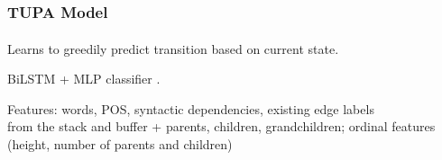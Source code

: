 \documentclass[t,xcolor={svgnames}]{beamer}
\newcommand{\parser}[1]{TUPA\textsubscript{#1}}
\begin{document}
\begin{frame}
\frametitle{\parser{} Model}
Learns to greedily predict transition based on current state.

BiLSTM + MLP classifier \cite{kiperwasser2016simple}.

\vfill

Features:
words, POS, syntactic dependencies, existing edge labels \\
from the stack and buffer + parents, children, grandchildren;
ordinal features (height, number of parents and children)

\vspace{5mm}
\end{frame}
\end{document}
